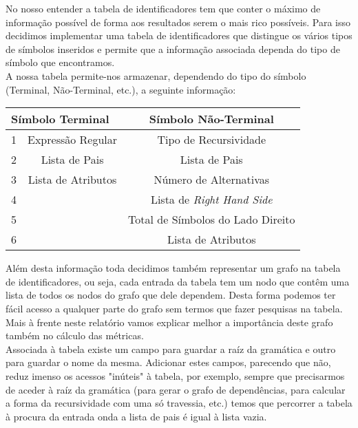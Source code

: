 \documentclass[a4paper,11pt]{article}
\begin{document}
No nosso entender a tabela de identificadores tem que conter o máximo de informação possível de forma aos resultados serem o mais rico possíveis. Para isso decidimos implementar uma tabela de identificadores que distingue os vários tipos de símbolos inseridos e permite que a informação associada dependa do tipo de símbolo que encontramos.\\
\newline
A nossa tabela permite-nos armazenar, dependendo do tipo do símbolo (Terminal, Não-Terminal, etc.), a seguinte informação:
\vspace{0.5cm}

\begin{center}
\begin{tabular}[c]{|l|c|c|}
\hline
\multicolumn{2}{|l|}{\textbf{Símbolo Terminal}} & \textbf{Símbolo Não-Terminal}\\
\hline
1 & Expressão Regular & Tipo de Recursividade\\
\hline
2 & Lista de Pais & Lista de Pais\\
\hline
3 & Lista de Atributos & Número de Alternativas\\
\hline
4 & & Lista de {\em Right Hand Side}\\
\hline
5 & & Total de Símbolos do Lado Direito\\
\hline
6 & & Lista de Atributos\\
\hline
\end{tabular}
\end{center}

\vspace{0.5cm}
Além desta informação toda decidimos também representar um grafo na tabela de identificadores, ou seja, cada entrada da tabela tem um nodo que contêm uma lista de todos os nodos do grafo que dele dependem. Desta forma podemos ter fácil acesso a qualquer parte do grafo sem termos que fazer pesquisas na tabela. Mais à frente neste relatório vamos explicar melhor a importância deste grafo também no cálculo das métricas.\\
\newline
Associada à tabela existe um campo para guardar a raíz da gramática e outro para guardar o nome da mesma. Adicionar estes campos, parecendo que não, reduz imenso os acessos "inúteis" à tabela, por exemplo, sempre que precisarmos de aceder à raíz da gramática (para gerar o grafo de dependências, para calcular a forma da recursividade com uma só travessia, etc.) temos que percorrer a tabela à procura da entrada onda a lista de pais é igual à lista vazia.\\
\end{document}
